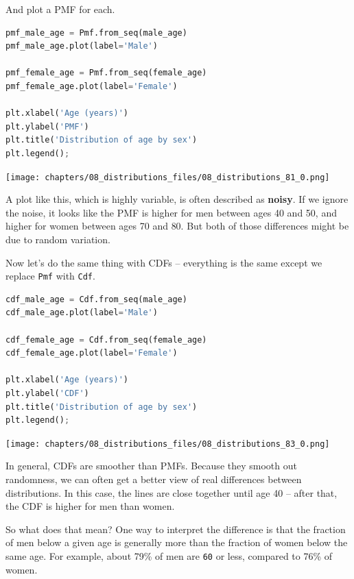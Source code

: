 And plot a PMF for each.

\begin{lstlisting}[language=Python,style=source]
pmf_male_age = Pmf.from_seq(male_age)
pmf_male_age.plot(label='Male')

pmf_female_age = Pmf.from_seq(female_age)
pmf_female_age.plot(label='Female')

plt.xlabel('Age (years)') 
plt.ylabel('PMF')
plt.title('Distribution of age by sex')
plt.legend();
\end{lstlisting}

\begin{center}
\texttt{[image: chapters/08\_distributions\_files/08\_distributions\_81\_0.png]}
\end{center}

A plot like this, which is highly variable, is often described as
\textbf{noisy}. If we ignore the noise, it looks like the PMF is higher
for men between ages 40 and 50, and higher for women between ages 70 and
80. But both of those differences might be due to random variation.

Now let's do the same thing with CDFs -- everything is the same except
we replace \passthrough{\lstinline!Pmf!} with
\passthrough{\lstinline!Cdf!}.

\begin{lstlisting}[language=Python,style=source]
cdf_male_age = Cdf.from_seq(male_age)
cdf_male_age.plot(label='Male')

cdf_female_age = Cdf.from_seq(female_age)
cdf_female_age.plot(label='Female')

plt.xlabel('Age (years)') 
plt.ylabel('CDF')
plt.title('Distribution of age by sex')
plt.legend();
\end{lstlisting}

\begin{center}
\texttt{[image: chapters/08\_distributions\_files/08\_distributions\_83\_0.png]}
\end{center}

In general, CDFs are smoother than PMFs. Because they smooth out
randomness, we can often get a better view of real differences between
distributions. In this case, the lines are close together until age 40
-- after that, the CDF is higher for men than women.

So what does that mean? One way to interpret the difference is that the
fraction of men below a given age is generally more than the fraction of
women below the same age. For example, about 79\% of men are
\passthrough{\lstinline!60!} or less, compared to 76\% of women.

